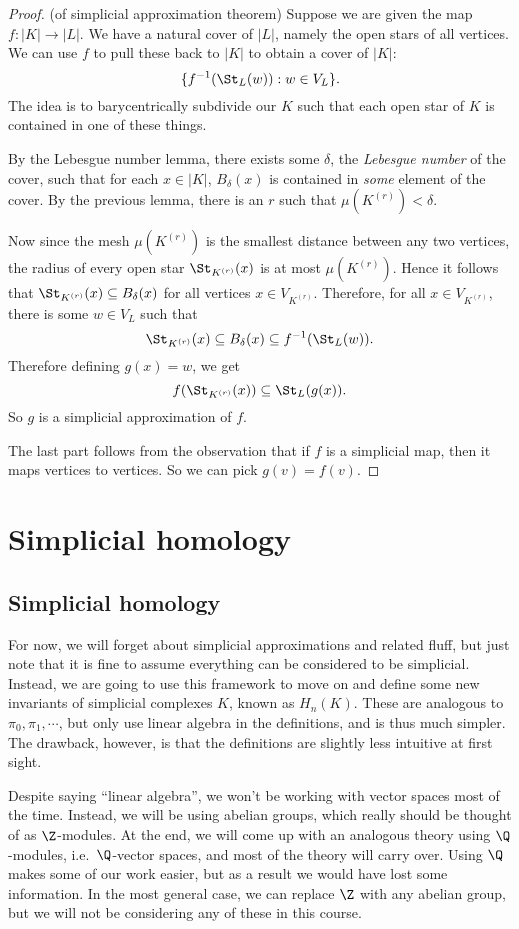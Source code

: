 \documentclass[a4paper]{article}
\begin{document}
\begin{proof}(of simplicial approximation theorem)
  Suppose we are given the map $f: |K| \to |L|$. We have a natural cover of $|L|$, namely the open stars of all vertices. We can use $f$ to pull these back to $|K|$ to obtain a cover of $|K|$:
  \[
    \{f^{-1}(\St_L(w)) : w \in V_L\}.
  \]
  The idea is to barycentrically subdivide our $K$ such that each open star of $K$ is contained in one of these things.

  By the Lebesgue number lemma, there exists some $\delta$, the \emph{Lebesgue number} of the cover, such that for each $x \in |K|$, $B_\delta(x)$ is contained in \emph{some} element of the cover. By the previous lemma, there is an $r$ such that $\mu(K^{(r)}) < \delta$.

  Now since the mesh $\mu(K^{(r)})$ is the smallest distance between any two vertices, the radius of every open star $\St_{K^{(r)}}(x)$ is at most $\mu(K^{(r)})$. Hence it follows that $\St_{K^{(r)}}(x) \subseteq B_\delta(x)$ for all vertices $x \in V_{K^{(r)}}$. Therefore, for all $x \in V_{K^{(r)}}$, there is some $w \in V_L$ such that
  \[
    \St_{K^{(r)}}(x) \subseteq B_\delta(x) \subseteq f^{-1}(\St_L(w)).
  \]
  Therefore defining $g(x) = w$, we get
  \[
    f(\St_{K^{(r)}}(x)) \subseteq \St_L(g(x)).
  \]
  So $g$ is a simplicial approximation of $f$.

  The last part follows from the observation that if $f$ is a simplicial map, then it maps vertices to vertices. So we can pick $g(v) = f(v)$.
\end{proof}

\section{Simplicial homology}
\subsection{Simplicial homology}
For now, we will forget about simplicial approximations and related fluff, but just note that it is fine to assume everything can be considered to be simplicial. Instead, we are going to use this framework to move on and define some new invariants of simplicial complexes $K$, known as $H_n(K)$. These are analogous to $\pi_0, \pi_1, \cdots$, but only use linear algebra in the definitions, and is thus much simpler. The drawback, however, is that the definitions are slightly less intuitive at first sight.

Despite saying ``linear algebra'', we won't be working with vector spaces most of the time. Instead, we will be using abelian groups, which really should be thought of as $\Z$-modules. At the end, we will come up with an analogous theory using $\Q$-modules, i.e.\ $\Q$-vector spaces, and most of the theory will carry over. Using $\Q$ makes some of our work easier, but as a result we would have lost some information. In the most general case, we can replace $\Z$ with any abelian group, but we will not be considering any of these in this course.
\end{document}
